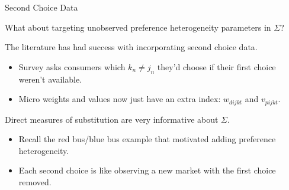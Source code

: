 \documentclass[aspectratio=169,t,11pt,table]{beamer}
\begin{document}
\begin{frame}{Second Choice Data}
    \begin{wideitemize}
        \item What about targeting unobserved preference heterogeneity parameters in $\Sigma$?
        \pause
        \item The literature has had success with incorporating second choice data.
        \begin{itemize}
            \item Survey asks consumers which $k_n \neq j_n$ they'd choose if their first choice weren't available.
            \item Micro weights and values now just have an extra index: $w_{dijkt}$ and $v_{pijkt}$.
        \end{itemize}
        \pause
        \item Direct measures of substitution are very informative about $\Sigma$.
        \begin{itemize}
            \item Recall the red bus/blue bus example that motivated adding preference heterogeneity.
            \item Each second choice is like observing a new market with the first choice removed.
        \end{itemize}
    \end{wideitemize}
\end{frame}
\end{document}
